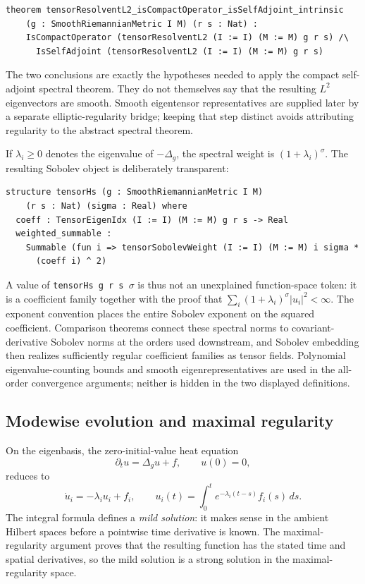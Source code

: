 \documentclass[11pt]{article}
\theoremstyle{plain}
\theoremstyle{definition}
\theoremstyle{remark}
\begin{document}
\begin{Verbatim}[breaklines=true,breakanywhere=true,fontsize=\small]
theorem tensorResolventL2_isCompactOperator_isSelfAdjoint_intrinsic
    (g : SmoothRiemannianMetric I M) (r s : Nat) :
    IsCompactOperator (tensorResolventL2 (I := I) (M := M) g r s) /\
      IsSelfAdjoint (tensorResolventL2 (I := I) (M := M) g r s)
\end{Verbatim}

The two conclusions are exactly the hypotheses needed
to apply the compact self-adjoint spectral theorem.  They do not themselves
say that the resulting $L^2$ eigenvectors are smooth.  Smooth eigentensor
representatives are supplied later by a separate elliptic-regularity bridge;
keeping that step distinct avoids attributing regularity to the abstract
spectral theorem.

If $\lambda_i\ge0$ denotes the eigenvalue of $-\Delta_g$, the spectral weight
is $(1+\lambda_i)^\sigma$.  The resulting Sobolev object is deliberately
transparent:

\begin{Verbatim}[breaklines=true,breakanywhere=true,fontsize=\small]
structure tensorHs (g : SmoothRiemannianMetric I M)
    (r s : Nat) (sigma : Real) where
  coeff : TensorEigenIdx (I := I) (M := M) g r s -> Real
  weighted_summable :
    Summable (fun i => tensorSobolevWeight (I := I) (M := M) i sigma *
      (coeff i) ^ 2)
\end{Verbatim}

A value of \texttt{tensorHs g r s $\sigma$} is thus not an unexplained
function-space token: it is a coefficient family together with the proof that
\(\sum_i(1+\lambda_i)^\sigma|u_i|^2<\infty\).  The exponent convention places
the entire Sobolev exponent on the squared coefficient.  Comparison theorems
connect these spectral norms to covariant-derivative Sobolev norms at the
orders used downstream, and Sobolev embedding then realizes sufficiently
regular coefficient families as tensor fields.  Polynomial eigenvalue-counting
bounds and smooth eigenrepresentatives are used in the all-order convergence
arguments; neither is hidden in the two displayed definitions.

\subsection{Modewise evolution and maximal regularity}
\label{subsec:short-time-maximal-regularity}

On the eigenbasis, the zero-initial-value heat equation
\[
  \partial_tu=\Delta_g u+f,
  \qquad u(0)=0,
\]
reduces to
\[
  \dot u_i=-\lambda_i u_i+f_i,
  \qquad
  u_i(t)=\int_0^t e^{-\lambda_i(t-s)}f_i(s)\,ds.
\]
The integral formula defines a \emph{mild solution}: it makes sense in the
ambient Hilbert spaces before a pointwise time derivative is known.  The
maximal-regularity argument proves that the resulting function has the stated
time and spatial derivatives, so the mild solution is a strong solution in
the maximal-regularity space.
\end{document}

